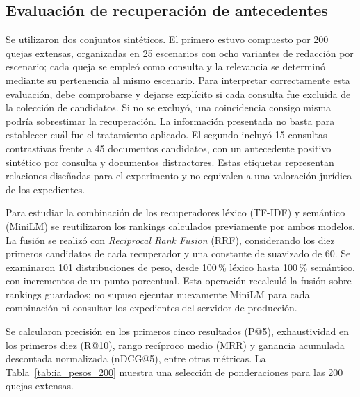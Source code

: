 \subsection{Evaluación de recuperación de antecedentes}
\label{sec:pruebas_ia_antecedentes}

Se utilizaron dos conjuntos sintéticos. El primero estuvo compuesto por 200 quejas extensas,
organizadas en 25 escenarios con ocho variantes de redacción por escenario; cada queja se
empleó como consulta y la relevancia se determinó mediante su pertenencia al mismo escenario.
Para interpretar correctamente esta evaluación, debe comprobarse y dejarse explícito
si cada consulta fue excluida de la colección de candidatos. Si no se excluyó,
una coincidencia consigo misma podría sobrestimar la recuperación. La información
presentada no basta para establecer cuál fue el tratamiento aplicado.
El segundo incluyó 15 consultas contrastivas frente a 45 documentos candidatos, con un
antecedente positivo sintético por consulta y documentos distractores. Estas etiquetas
representan relaciones diseñadas para el experimento y no equivalen a una valoración jurídica
de los expedientes.

Para estudiar la combinación de los recuperadores léxico (TF-IDF) y semántico (MiniLM) se
reutilizaron los rankings calculados previamente por ambos modelos. La fusión se realizó con
\textit{Reciprocal Rank Fusion} (RRF), considerando los diez primeros candidatos de cada
recuperador y una constante de suavizado de 60. Se examinaron 101 distribuciones de peso,
desde 100\,\% léxico hasta 100\,\% semántico, con incrementos de un punto porcentual. Esta
operación recalculó la fusión sobre rankings guardados; no supuso ejecutar nuevamente MiniLM
para cada combinación ni consultar los expedientes del servidor de producción.

Se calcularon precisión en los primeros cinco resultados (P@5), exhaustividad en los primeros
diez (R@10), rango recíproco medio (MRR) y ganancia acumulada descontada normalizada
(nDCG@5), entre otras métricas. La Tabla~\ref{tab:ia_pesos_200} muestra una selección de
ponderaciones para las 200 quejas extensas.


